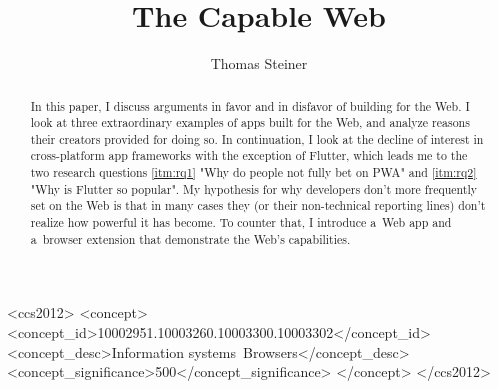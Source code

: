 \documentclass[sigconf]{acmart}
\begin{document}
\title{The Capable Web}

\author{Thomas Steiner}


\begin{abstract}
  In this paper, I discuss arguments in favor and in disfavor of building for the Web. I look at three extraordinary examples of apps built for the Web, and analyze reasons their creators provided for doing so. In continuation, I look at the decline of interest in cross-platform app frameworks with the exception of Flutter, which leads me to the two research questions \ref{itm:rq1} "Why do people not fully bet on PWA" and \ref{itm:rq2} "Why is Flutter so popular". My hypothesis for why developers don't more frequently set on the Web is that in many cases they (or their non-technical reporting lines) don't realize how powerful it has become. To counter that, I introduce a~Web app and a~browser extension that demonstrate the Web's capabilities.
\end{abstract}

\begin{CCSXML}
<ccs2012>
<concept>
<concept_id>10002951.10003260.10003300.10003302</concept_id>
<concept_desc>Information systems~Browsers</concept_desc>
<concept_significance>500</concept_significance>
</concept>
</ccs2012>
\end{CCSXML}

\end{document}
